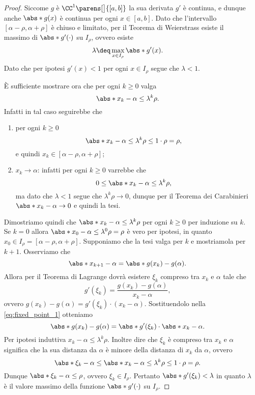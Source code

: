 \begin{proof}
    Siccome $g$ è $\CC^1\parens[\big]{[a, b]}$ la sua derivata $g'$ è continua, e dunque anche $\abs*{g(x)}$ è continua per ogni $x \in [a, b]$. Dato che l'intervallo $[\alpha - \rho, \alpha + \rho]$ è chiuso e limitato, per il Teorema di Weierstrass esiste il massimo di $\abs*{g'(\cdot)}$ su $I_\rho$, ovvero esiste \[
        \lambda \deq \max_{x \in I_\rho} \abs*{g'(x)}.
    \] Dato che per ipotesi $g'(x) < 1$ per ogni $x \in I_\rho$ segue che $\lambda < 1$.
    
    È sufficiente mostrare ora che per ogni $k \geq 0$ valga \[
        \abs*{x_k - \alpha} \leq \lambda^k \rho.
    \] Infatti in tal caso seguirebbe che \begin{enumerate}
        \item per ogni $k \geq 0$ \[
            \abs*{x_k - \alpha} \leq \lambda^k\rho \leq 1 \cdot \rho = \rho,
        \] e quindi $x_k \in [\alpha-\rho, \alpha+\rho]$;
        \item $x_k \to \alpha$: infatti per ogni $k \geq 0$ varrebbe che \[
            0 \leq \abs*{x_k - \alpha} \leq \lambda^k \rho,
        \] ma dato che $\lambda < 1$ segue che $\lambda^k\rho \to 0$, dunque per il Teorema dei Carabinieri $\abs*{x_k - \alpha} \to 0$ e quindi la tesi.   
    \end{enumerate}

    Dimostriamo quindi che $\abs*{x_k - \alpha} \leq \lambda^k\rho$ per ogni $k \geq 0$ per induzione su $k$.
     Se $k = 0$ allora $\abs*{x_0 - \alpha} \leq \lambda^0\rho = \rho$ è vero per ipotesi, in quanto $x_0 \in I_\rho = [\alpha - \rho, \alpha + \rho]$.
     Supponiamo che la tesi valga per $k$ e mostriamola per $k+1$. Osserviamo che \begin{equation} \label{eq:fixed_point_1}
        \abs*{x_{k+1} - \alpha} = \abs*{g(x_k) - g(\alpha)}.
    \end{equation} Allora per il Teorema di Lagrange dovrà esistere $\xi_k$ compreso tra $x_k$ e $\alpha$ tale che \[
        g'(\xi_k) = \frac{g(x_k) - g(\alpha)}{x_k - \alpha},
    \] ovvero $g(x_k) - g(\alpha) = g'(\xi_k)\cdot (x_k - \alpha)$. Sostituendolo nella \eqref{eq:fixed_point_1} otteniamo \begin{equation} \label{eq:fixed_point_2}
        \abs*{g(x_k) - g(\alpha)} = \abs*{g'(\xi_k)} \cdot \abs*{x_k - \alpha}.
    \end{equation} Per ipotesi induttiva $x_k - \alpha \leq \lambda^k\rho$. Inoltre dire che $\xi_k$ è compreso tra $x_k$ e $\alpha$ significa che la sua distanza da $\alpha$ è minore della distanza di $x_k$ da $\alpha$, ovvero \[
        \abs*{\xi_k - \alpha} \leq \abs*{x_k - \alpha} \leq \lambda^k\rho \leq 1\cdot\rho = \rho.
    \] Dunque $\abs*{\xi_k - \alpha} \leq \rho$, ovvero $\xi_k \in I_\rho$. Pertanto $\abs*{g'(\xi_k)} < \lambda$ in quanto $\lambda$ è il valore massimo della funzione $\abs*{g'(\cdot)}$ su $I_\rho$.


\end{proof}

